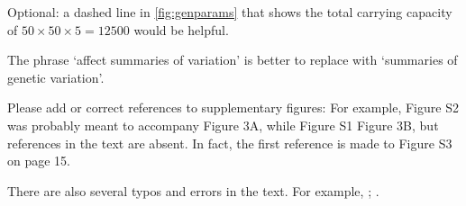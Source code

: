 \begin{point}{}
    Optional: a dashed line in \autoref{fig:genparams}
    that shows the total carrying capacity of $50 \times 50 \times 5=12500$ would be helpful.
\end{point}


\begin{point}{\revref}
    The phrase `affect summaries of variation' is better to replace with `summaries of genetic variation'.
\end{point}


\begin{point}{}
    Please add or correct references to supplementary figures: For example, Figure S2 was probably meant to accompany Figure 3A, while Figure S1 Figure 3B, but references in the text are absent. In fact, the first reference is made to Figure S3 on page 15.
\end{point}



\begin{point}{}
    There are also several typos and errors in the text. For example, \revref; .
\end{point}






